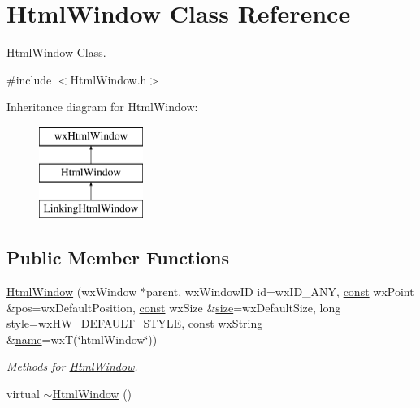 \hypertarget{class_html_window}{}\section{Html\+Window Class Reference}
\label{class_html_window}


\hyperlink{class_html_window}{Html\+Window} Class.  




{\ttfamily \#include $<$Html\+Window.\+h$>$}

Inheritance diagram for Html\+Window\+:\begin{figure}[H]
\begin{center}
\leavevmode
\includegraphics[height=3.000000cm]{class_html_window}
\end{center}
\end{figure}
\subsection*{Public Member Functions}
\begin{DoxyCompactItemize}
\item 
\hyperlink{class_html_window_a55a071cf1e06abd166e82ed426c00fe0}{Html\+Window} (wx\+Window $\ast$parent, wx\+Window\+ID id=wx\+I\+D\+\_\+\+A\+NY, \hyperlink{getopt1_8c_a2c212835823e3c54a8ab6d95c652660e}{const} wx\+Point \&pos=wx\+Default\+Position, \hyperlink{getopt1_8c_a2c212835823e3c54a8ab6d95c652660e}{const} wx\+Size \&\hyperlink{group__lavu__mem_ga854352f53b148adc24983a58a1866d66}{size}=wx\+Default\+Size, long style=wx\+H\+W\+\_\+\+D\+E\+F\+A\+U\+L\+T\+\_\+\+S\+T\+Y\+LE, \hyperlink{getopt1_8c_a2c212835823e3c54a8ab6d95c652660e}{const} wx\+String \&\hyperlink{lib_2expat_8h_a1b49b495b59f9e73205b69ad1a2965b0}{name}=wxT(\char`\"{}html\+Window\char`\"{}))
\begin{DoxyCompactList}\small\item\em Methods for \hyperlink{class_html_window}{Html\+Window}. \end{DoxyCompactList}\item 
virtual \hyperlink{class_html_window_a72397cd6d5e7332342c937d7862b1133}{$\sim$\+Html\+Window} ()
\end{DoxyCompactItemize}


